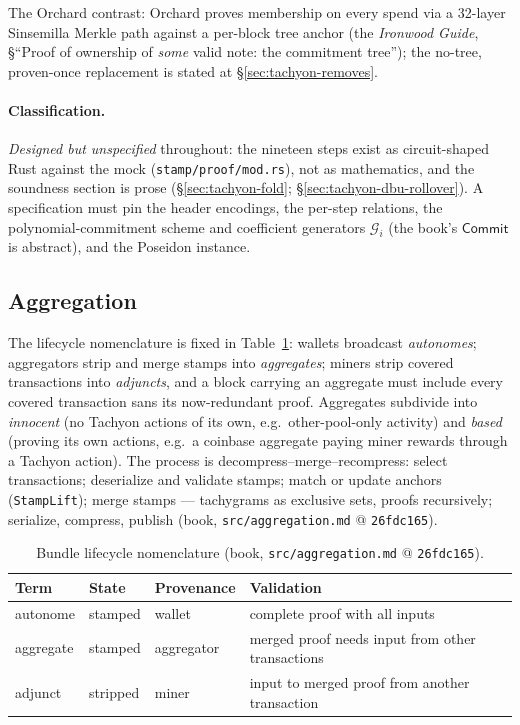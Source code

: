 \documentclass[11pt,a4paper]{article}
\theoremstyle{definition}
\newcommand{\Comm}{\mathsf{Commit}}
\begin{document}
The Orchard contrast: Orchard proves membership on every spend via a
32-layer Sinsemilla Merkle path against a per-block tree anchor (the
\emph{Ironwood Guide}, \S``Proof of ownership of \emph{some} valid note: the
commitment tree''); the no-tree, proven-once replacement is stated at
\S\ref{sec:tachyon-removes}.

\paragraph{Classification.} \emph{Designed but unspecified} throughout:
the nineteen steps exist as circuit-shaped Rust against the mock
(\texttt{stamp/proof/mod.rs}), not as mathematics, and the soundness
section is prose (\S\ref{sec:tachyon-fold};
\S\ref{sec:tachyon-dbu-rollover}). A specification must pin the header
encodings, the per-step relations, the polynomial-commitment scheme and
coefficient generators $\mathcal{G}_i$ (the book's $\Comm$ is abstract),
and the Poseidon instance.

\FloatBarrier

\subsection{Aggregation}\label{sec:tachyon-design-agg}

The lifecycle nomenclature is fixed in
Table~\ref{tab:tachyon-design-agg}: wallets broadcast \emph{autonomes};
aggregators strip and merge stamps into \emph{aggregates}; miners strip
covered transactions into \emph{adjuncts}, and a block carrying an
aggregate must include every covered transaction sans its now-redundant
proof. Aggregates subdivide into \emph{innocent} (no Tachyon actions of
its own, e.g.\ other-pool-only activity) and \emph{based} (proving its own
actions, e.g.\ a coinbase aggregate paying miner rewards through a Tachyon
action). The process is decompress--merge--recompress: select
transactions; deserialize and validate stamps; match or update anchors
(\texttt{StampLift}); merge stamps --- tachygrams as exclusive sets,
proofs recursively; serialize, compress, publish (book,
\texttt{src/aggregation.md} @ \texttt{26fdc165}).

\begin{table}[htbp]
\centering
\small
\begin{tabular}{@{}llll@{}}
\toprule
Term & State & Provenance & Validation \\
\midrule
autonome  & stamped  & wallet     & complete proof with all inputs \\
aggregate & stamped  & aggregator & merged proof needs input from other
  transactions \\
adjunct   & stripped & miner      & input to merged proof from another
  transaction \\
\bottomrule
\end{tabular}
\caption{Bundle lifecycle nomenclature (book, \texttt{src/aggregation.md}
@ \texttt{26fdc165}).}
\label{tab:tachyon-design-agg}
\end{table}
\end{document}
